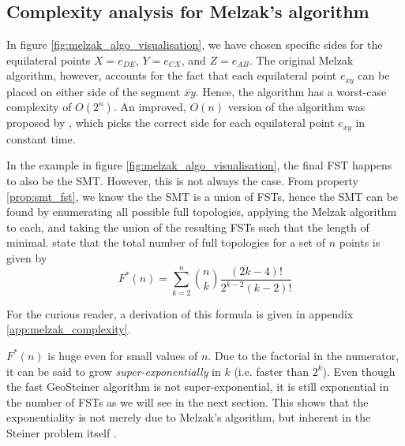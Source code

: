 \documentclass{l4proj}
\begin{document}
\subsection{Complexity analysis for Melzak's algorithm}
In figure \ref{fig:melzak_algo_visualisation}, we have chosen specific sides for the equilateral points $X = e_{DE}$, $Y = e_{CX}$, and $Z = e_{AB}$.
The original Melzak algorithm, however, accounts for the fact that each equilateral point $e_{xy}$ can be placed on either side of the segment $\overline{xy}$. Hence, the algorithm has a worst-case complexity of $O(2^n)$.
An improved, $O(n)$ version of the algorithm was proposed by \cite{Melzak_linear_time}, which picks the correct side for each equilateral point $e_{xy}$ in constant time.

In the example in figure \ref{fig:melzak_algo_visualisation}, the final FST happens to also be the SMT. However, this is not always the case. From property \ref{prop:smt_fst}, we know the the SMT is a union of FSTs, hence the SMT can be found by enumerating all possible full topologies, applying the Melzak algorithm to each, and taking the union of the resulting FSTs such that the length of minimal. \cite{geosteiner96} state that the total number of full topologies for a set of $n$ points is given by
$$
    F^*(n) = \sum_{k=2}^{n} \binom{n}{k}\frac{(2k - 4)!}{2^{k-2}(k-2)!}
$$

For the curious reader, a derivation of this formula is given in appendix \ref{app:melzak_complexity}.

$F^*(n)$ is huge even for small values of $n$. Due to the factorial in the numerator, it can be said to grow \textit{super-exponentially} in $k$ (i.e. faster than $2^k$). Even though the fast GeoSteiner algorithm is not super-exponential, it is still exponential in the number of FSTs as we will see in the next section. This shows that the exponentiality is not merely due to Melzak's algorithm, but inherent in the Steiner problem itself \cite{Brazil2015}.
\end{document}
